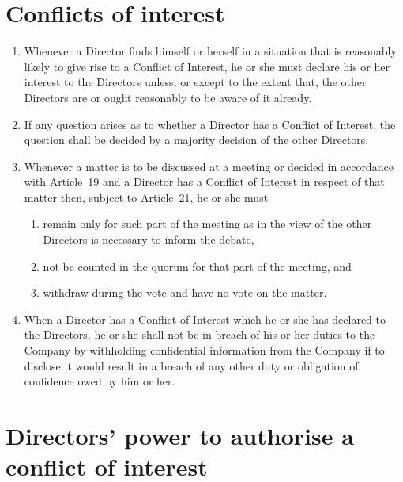 \documentclass[a4paper,12pt]{article}
\begin{document}
\section{Conflicts of interest}

\begin{enumerate}
  \item Whenever a Director finds himself or herself in a situation that is reasonably likely to give rise to a Conflict of Interest, he or she must declare his or her interest to the Directors unless, or except to the extent that, the other Directors are or ought reasonably to be aware of it already.
  \item If any question arises as to whether a Director has a Conflict of Interest, the question shall be decided by a majority decision of the other Directors.
  \item Whenever a matter is to be discussed at a meeting or decided in accordance with Article 19 and a Director has a Conflict of Interest in respect of that matter then, subject to Article 21, he or she must
  \begin{enumerate}
    \item	remain only for such part of the meeting as in the view of the other Directors is necessary to inform the debate,
    \item not be counted in the quorum for that part of the meeting, and
    \item withdraw during the vote and have no vote on the matter.
  \end{enumerate}
  \item	When a Director has a Conflict of Interest which he or she has declared to the Directors, he or she shall not be in breach of his or her duties to the Company by withholding confidential information from the Company if to disclose it would result in a breach of any other duty or obligation of confidence owed by him or her.
\end{enumerate}

\section{Directors’ power to authorise a conflict of interest}
\end{document}
